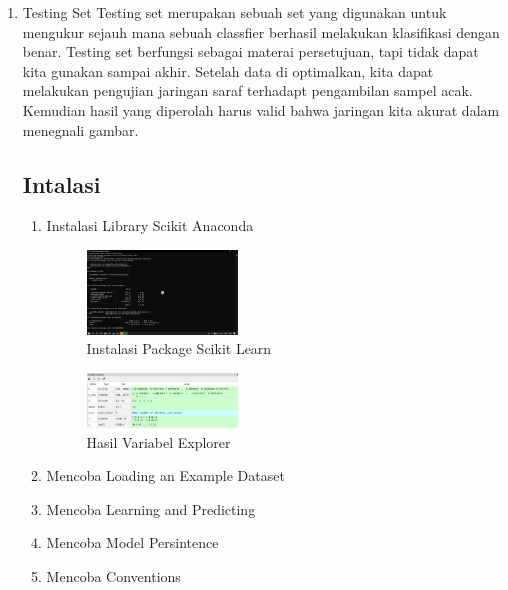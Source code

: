 \begin{enumerate}
\item Testing Set
Testing set merupakan sebuah set yang digunakan untuk mengukur sejauh mana sebuah classfier berhasil melakukan klasifikasi dengan benar. Testing set berfungsi sebagai materai persetujuan, tapi tidak dapat kita gunakan sampai akhir. Setelah data di optimalkan, kita dapat melakukan pengujian jaringan saraf terhadapt pengambilan sampel acak. Kemudian hasil yang diperolah harus valid bahwa jaringan kita akurat dalam menegnali gambar.\\

\subsection{Intalasi}
\begin{enumerate}
\item Instalasi  Library Scikit Anaconda
	\hfill\break
	\begin{figure}[H]
		\includegraphics[width=4cm]{figures/1174062/1.PNG}
		\centering
		\caption{Instalasi Package Scikit Learn}
	\end{figure}
	\begin{figure}[H]
		\includegraphics[width=4cm]{figures/1174062/2.PNG}
		\centering
		\caption{Hasil Variabel Explorer}
	\end{figure}
\item Mencoba Loading an Example Dataset
\hfill\break
	
\item Mencoba Learning and Predicting
\hfill\break
	
\item Mencoba Model Persintence
\hfill\break
	
\item Mencoba Conventions
\hfill\break
	


\end{enumerate}
\end{enumerate}
